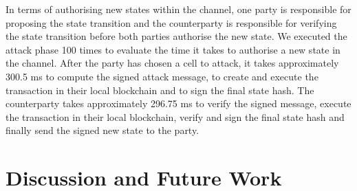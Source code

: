 \documentclass{llncs}
\newcommand{\battleshipbegin}{\mathsf{BS.begingame}}
\begin{document}
	In terms of authorising new states within the channel, one party is responsible for proposing the state transition and the counterparty is responsible for verifying the state transition before both parties authorise the new state. 
	We executed the attack phase 100 times to evaluate the time it takes to authorise a new state in the channel. 
	After the party has chosen a cell to attack, it takes approximately 300.5 ms to compute the signed attack message, to create and execute the transaction in their local blockchain and to sign the final state hash. 
	The counterparty takes approximately 296.75 ms to verify the signed message, execute the transaction in their local blockchain, verify and sign the final state hash and finally send the signed new state to the party. 
	
	
	\section{Discussion and Future Work} 
	
	
	
	
\end{document}

